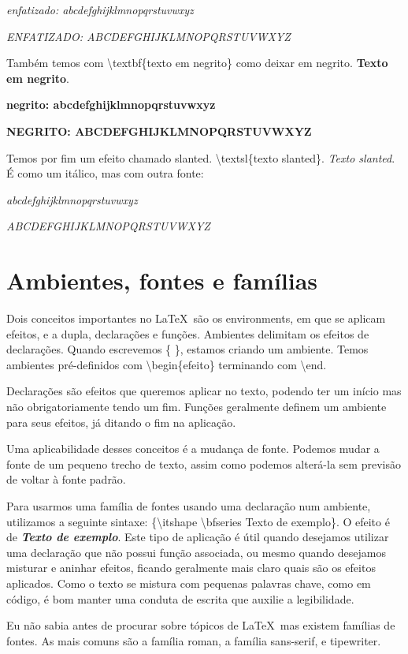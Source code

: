 \emph{enfatizado: abcdefghijklmnopqrstuvwxyz}

\emph{ENFATIZADO: ABCDEFGHIJKLMNOPQRSTUVWXYZ}

Também temos com \textbackslash textbf\{texto em negrito\} como deixar em negrito.
\textbf{Texto em negrito}.

\textbf{negrito: abcdefghijklmnopqrstuvwxyz}

\textbf{NEGRITO: ABCDEFGHIJKLMNOPQRSTUVWXYZ}

Temos por fim um efeito chamado slanted. \textbackslash textsl\{texto slanted\}.
\textsl{Texto slanted}. É como um itálico, mas com outra fonte:

\textsl{abcdefghijklmnopqrstuvwxyz}

\textsl{ABCDEFGHIJKLMNOPQRSTUVWXYZ}


\section{Ambientes, fontes e famílias}
Dois conceitos importantes no \LaTeX\ são os environments,
em que se aplicam efeitos, e a dupla, declarações e funções.
Ambientes delimitam os efeitos de declarações.
Quando escrevemos \{ \}, estamos criando um ambiente.
Temos ambientes pré-definidos com \textbackslash begin\{efeito\} terminando com \textbackslash end.

Declarações são efeitos que queremos aplicar no texto, podendo ter um início mas não obrigatoriamente tendo um fim.
Funções geralmente definem um ambiente para seus efeitos, já ditando o fim na aplicação.

Uma aplicabilidade desses conceitos é a mudança de fonte.
Podemos mudar a fonte de um pequeno trecho de texto, assim como podemos alterá-la sem previsão de voltar à fonte padrão.

Para usarmos uma família de fontes usando uma declaração num ambiente, utilizamos a seguinte sintaxe:
\{\textbackslash itshape \textbackslash bfseries Texto de exemplo\}.
O efeito é de {\itshape \bfseries Texto de exemplo}.
Este tipo de aplicação é útil quando desejamos utilizar uma declaração que não possui função associada,
ou mesmo quando desejamos misturar e aninhar efeitos, ficando geralmente mais claro quais são os efeitos aplicados.
Como o texto se mistura com pequenas palavras chave, como em código, é bom manter uma conduta de escrita que auxilie a legibilidade.

Eu não sabia antes de procurar sobre tópicos de \LaTeX\, mas existem famílias de fontes.
As mais comuns são a família roman, a família sans-serif, e tipewriter.

